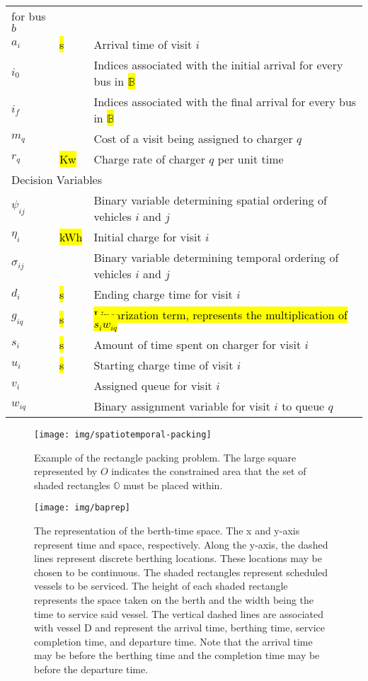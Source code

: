 \documentclass[utf8]{FrontiersinHarvard}
\begin{document}
\begin{table}[!htpb]
\begin{tabularx}{\textwidth}{l l l}
    for bus $b$ \\ $a_i$ & \hl{s} & Arrival time of visit $i$ \\ $i_0$ & & Indices associated with the initial arrival
    for every bus in \hl{$\mathbb{B}$} \\ $i_f$ & & Indices associated with the final arrival for every bus in
    \hl{$\mathbb{B}$} \\ $m_q$ & & Cost of a visit being assigned to charger $q$ \\ $r_q$ & \hl{Kw} & Charge rate of
    charger $q$ per unit time \\ \hline \multicolumn{3}{l}{Decision Variables} \\ \hline $\psi_{ij}$ & & Binary variable
    determining spatial ordering of vehicles $i$ and $j$ \\ $\eta_i$ & \hl{kWh} & Initial charge for visit $i$
    \\ $\sigma_{ij}$ & & Binary variable determining temporal ordering of vehicles $i$ and $j$ \\ $d_i$ & \hl{s} &
    Ending charge time for visit $i$ \\ $g_{iq}$ & \hl{s} & \hl{Linearization term, represents the multiplication of
      $s_i w_{iq}$} \\ $s_i$ & \hl{s} & Amount of time spent on charger for visit $i$ \\ $u_i$ & \hl{s} & Starting
    charge time of visit $i$ \\ $v_i$ & & Assigned queue for visit $i$ \\ $w_{iq}$ & & Binary assignment variable for
    visit $i$ to queue $q$ \\ \bottomrule
  \end{tabularx}
\end{table}

\begin{figure}[htpb]
\centering
    \texttt{[image: img/spatiotemporal-packing]}
    \caption{Example of the rectangle packing problem. The large square represented by $O$ indicates the constrained
      area that the set of shaded rectangles $\mathbb{O}$ must be placed within.}
    \label{fig:packexample}
\end{figure}

\begin{figure}[ht]
\centering
    \texttt{[image: img/baprep]}
    \caption{The representation of the berth-time space. The x and y-axis represent time and space, respectively. Along
      the y-axis, the dashed lines represent discrete berthing locations. These locations may be chosen to be
      continuous. The shaded rectangles represent scheduled vessels to be serviced. The height of each shaded rectangle
      represents the space taken on the berth and the width being the time to service said vessel. The vertical dashed
      lines are associated with vessel D and represent the arrival time, berthing time, service completion time, and
      departure time. Note that the arrival time may be before the berthing time and the completion time may be before
      the departure time.}
    \label{fig:bap}
\end{figure}
\end{document}
